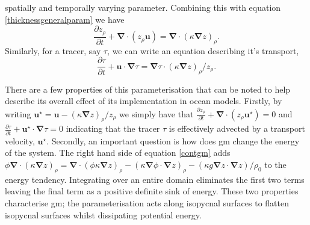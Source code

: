 \documentclass[10pt,a4paper]{article}
\begin{document}
     spatially and temporally varying parameter. Combining this with equation \ref{thicknessgeneralparam} we have
          \begin{equation}
          \frac{\partial z_{\rho}}{\partial t} + \boldsymbol{\nabla}\cdot\left(z_{\rho}\boldsymbol{u}\right) = \boldsymbol{\nabla}\cdot\left(\kappa
              \boldsymbol{\nabla} z \right)_{\rho} .
              \label{contgm}
          \end{equation}
    Similarly, for a tracer, say $\tau$, we can write an equation
    describing it's transport,
            \begin{equation}
              \frac{\partial \tau}{\partial t} + \boldsymbol{u}\cdot\boldsymbol{\nabla}\tau = \boldsymbol{\nabla}\tau\cdot
              \left(\kappa \boldsymbol{\nabla} z \right)_{\rho}/z_{\rho} .
            \end{equation}
            
    There are a few properties of this parameterisation that can be 
    noted to help describe its overall effect of its implementation in
    ocean models. Firstly, by writing $\boldsymbol{u}^{\star} = \boldsymbol{u} -
    \left(\kappa \boldsymbol{\nabla} z \right)_{\rho}/z_{\rho}$ we 
    simply have that $\frac{\partial z_{\rho}}{\partial t} + \boldsymbol{\nabla}\cdot\left(z_{\rho}\boldsymbol{u}^{\star}\right) = 0$ and $\frac{\partial \tau}{\partial t} + \boldsymbol{u}^{\star}\cdot\boldsymbol{\nabla}\tau = 0$ indicating
    that the tracer $\tau$ is effectively advected by a transport velocity, 
     $\boldsymbol{u}^{\star}$. Secondly, an important 
    question is how does \gls{gm} change the energy of the system. 
    The right hand side of equation \ref{contgm} adds 
    $\phi \boldsymbol{\nabla}\cdot\left(\kappa
                  \boldsymbol{\nabla} z \right)_{\rho} 
                  = \boldsymbol{\nabla}\cdot\left(\phi\kappa
                       \boldsymbol{\nabla} z \right)_{\rho} 
                  -\left(\kappa
              \boldsymbol{\nabla}\phi\cdot \boldsymbol{\nabla} z \right)_{\rho} 
                                -\left(\kappa g
                            \boldsymbol{\nabla}z\cdot \boldsymbol{\nabla} z \right)/{\rho_{0}} 
                $ to the energy tendency. Integrating over an entire domain
                eliminates the first two terms leaving the final term
                as a positive definite sink of energy. These two 
                properties characterise \gls{gm}; the parameterisation
                acts along isopycnal surfaces to flatten isopycnal 
                surfaces whilst dissipating potential energy.
                
\end{document}
